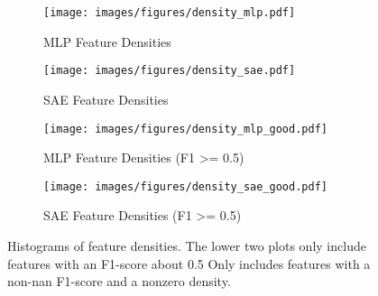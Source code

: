 \begin{figure}[h]
    \centering
    
    \begin{subfigure}[b]{0.45\textwidth}
        \centering
        \texttt{[image: images/figures/density\_mlp.pdf]}
        \caption{MLP Feature Densities}
        \label{fig:density_mlp}
    \end{subfigure}
    \begin{subfigure}[b]{0.45\textwidth}
        \centering
        \texttt{[image: images/figures/density\_sae.pdf]}
        \caption{SAE Feature Densities}
        \label{fig:density_sae}
    \end{subfigure}
    
    \begin{subfigure}[b]{0.45\textwidth}
        \centering
        \texttt{[image: images/figures/density\_mlp\_good.pdf]}
        \caption{MLP Feature Densities (F1 >= 0.5)}
        \label{fig:density_mlp_good}
    \end{subfigure}
    \begin{subfigure}[b]{0.45\textwidth}
        \centering
        \texttt{[image: images/figures/density\_sae\_good.pdf]}
        \caption{SAE Feature Densities (F1 >= 0.5)}
        \label{fig:density_sae_good}
    \end{subfigure}
    
    \caption{Histograms of feature densities. The lower two plots only include features with an F1-score about 0.5 Only includes features with a non-nan F1-score and a nonzero density.}
    \label{fig:density}
\end{figure}

